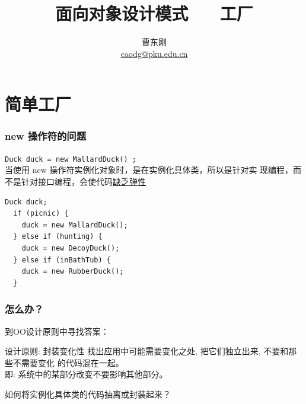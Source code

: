 \documentclass[compress]{beamer}
\begin{document}

					
\title[工厂模式]{面向对象设计模式 ~~ 工厂}

\author[曹东刚]
{曹东刚\\\href{mailto:caodg@pku.edu.cn}{caodg@pku.edu.cn}}


\date{}


\begin{frame}[plain]
	\titlepage
\end{frame}

\setcounter{framenumber}{0}


\section{简单工厂}

\begin{frame}[fragile]
  \frametitle{new 操作符的问题}
  \verb~Duck duck = new MallardDuck() ;~ \\
  当使用 \alert{new} 操作符实例化对象时，是在实例化具体类，所以是针对实
  现编程，而不是针对接口编程，会使代码\uline{缺乏弹性}  \\[3ex]
\begin{Verbatim}[label=使用大量具体类而难以更新和维护的代码]
  Duck duck;
  if (picnic) {
    duck = new MallardDuck();
  } else if (hunting) {
    duck = new DecoyDuck();
  } else if (inBathTub) {
    duck = new RubberDuck();
  }
\end{Verbatim}

\end{frame}

\begin{frame}
\frametitle{怎么办？}
到OO设计原则中寻找答案：\\[2ex]
\begin{block}{设计原则: 封装变化性}
    找出应用中可能需要变化之处, 把它们独立出来, 不要和那些不需要变化
    的代码混在一起。 \\
    即: 系统中的某部分改变不要影响其他部分。
\end{block}

\vspace*{3ex}
如何将实例化具体类的代码抽离或封装起来？

\end{frame}
\end{document}
